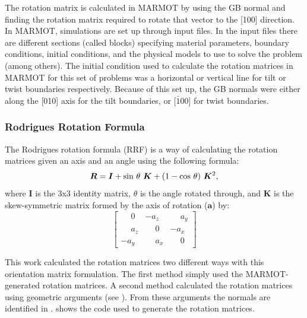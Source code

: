 \documentclass[twoside,senior]{BYUPhys}
\begin{document}
The rotation matrix is calculated in MARMOT by using the GB normal and finding the rotation matrix required to rotate that vector to the [100] direction.  In MARMOT, simulations are set up through input files.  In the input files there are different sections (called blocks) specifying material parameters, boundary conditions, initial conditions, and the physical models to use to solve the problem (among others).  The initial condition used to calculate the rotation matrices in MARMOT for this set of problems was a horizontal or vertical line for tilt or twist boundaries respectively.  Because of this set up, the GB normals were either along the [010] axis for the tilt boundaries, or [$\bar{1}$00] for twist boundaries.

\subsubsection{Rodrigues Rotation Formula\label{PQ:RRF}}
The Rodrigues rotation formula\cite{belongie2006} (RRF) is a way of calculating the rotation matrices given an axis and an angle using the following formula:
\begin{equation}
\label{eq:rrf}
\bm{R} = \bm{I} + \textnormal{sin}\ \theta\ \bm{K} + (1 - \textnormal{cos}\ \theta)\ \bm{K}^2,
\end{equation}
where $\bm{I}$ is the 3x3 identity matrix, $\theta$ is the angle rotated through, and $\bm{K}$ is the skew-symmetric matrix formed by the axis of rotation ($\bm{a}$) by:
\begin{equation}
\label{eq:skewSymMat}
\left[
\begin{array}{ccc}
\phantom{-}0 & -a_z & \phantom{-}a_y \\
\phantom{-}a_z & \phantom{-}0 & -a_x \\
-a_y & \phantom{-}a_x & \phantom{-}0
\end{array}
\right]
\end{equation}

This work calculated the rotation matrices two different ways with this orientation matrix formulation.  The first method simply used the MARMOT-generated rotation matrices.  A second method calculated the rotation matrices using geometric arguments (see ).  From these arguments the normals are identified in .   shows the code used to generate the rotation matrices.
\end{document}
